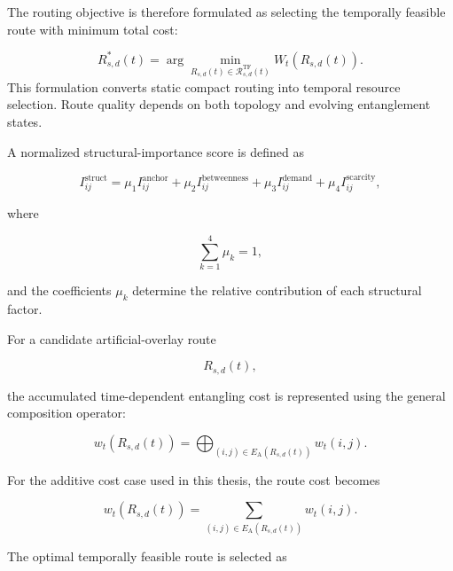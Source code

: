 The routing objective is therefore formulated as selecting the temporally feasible route with minimum total cost:

\begin{equation}
    R^{*}_{s,d}(t)
    =
    \arg\min_{
    R_{s,d}(t)
    \in
    \mathcal{R}_{s,d}^{\mathrm{TF}}(t)
    }
    W_t
    \left(
    R_{s,d}(t)
    \right).
\end{equation}
This formulation converts static compact routing into temporal resource
selection. Route quality depends on both topology and evolving entanglement
states.

A normalized structural-importance score is defined as

\begin{equation}
    I_{ij}^{\mathrm{struct}}
    =
    \mu_1
    I_{ij}^{\mathrm{anchor}}
    +
    \mu_2
    I_{ij}^{\mathrm{betweenness}}
    +
    \mu_3
    I_{ij}^{\mathrm{demand}}
    +
    \mu_4
    I_{ij}^{\mathrm{scarcity}},
\end{equation}

where

\begin{equation}
    \sum_{k=1}^{4}
    \mu_k
    =
    1,
\end{equation}

and the coefficients $\mu_k$ determine the relative contribution of each structural factor.

For a candidate artificial-overlay route

\begin{equation}
    R_{s,d}(t),
\end{equation}

the accumulated time-dependent entangling cost is represented using the general composition operator:

\begin{equation}
    w_t
    \left(
    R_{s,d}(t)
    \right)
    =
    \bigoplus_{
    (i,j)
    \in
    E_{\mathrm{A}}(R_{s,d}(t))
    }
    w_t(i,j).
\end{equation}

For the additive cost case used in this thesis, the route cost becomes

\begin{equation}
    w_t
    \left(
    R_{s,d}(t)
    \right)
    =
    \sum_{
    (i,j)
    \in
    E_{\mathrm{A}}(R_{s,d}(t))
    }
    w_t(i,j).
\end{equation}

The optimal temporally feasible route is selected as

